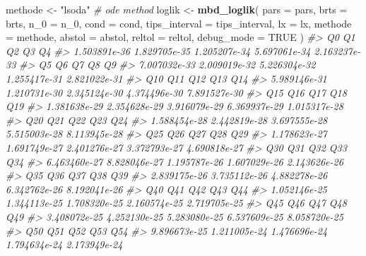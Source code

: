 \documentclass[]{article}
\newenvironment{Shaded}{\begin{snugshade}}{\end{snugshade}}
\newcommand{\CommentTok}[1]{\textcolor[rgb]{0.56,0.35,0.01}{\textit{#1}}}
\newcommand{\DataTypeTok}[1]{\textcolor[rgb]{0.13,0.29,0.53}{#1}}
\newcommand{\DecValTok}[1]{\textcolor[rgb]{0.00,0.00,0.81}{#1}}
\newcommand{\KeywordTok}[1]{\textcolor[rgb]{0.13,0.29,0.53}{\textbf{#1}}}
\newcommand{\NormalTok}[1]{#1}
\newcommand{\OtherTok}[1]{\textcolor[rgb]{0.56,0.35,0.01}{#1}}
\newcommand{\StringTok}[1]{\textcolor[rgb]{0.31,0.60,0.02}{#1}}
\begin{document}
\begin{Shaded}
\begin{Highlighting}[]
\NormalTok{methode <-}\StringTok{ "lsoda"} \CommentTok{# ode method}
\NormalTok{loglik <-}\StringTok{ }\KeywordTok{mbd_loglik}\NormalTok{(}
  \DataTypeTok{pars =}\NormalTok{ pars,}
  \DataTypeTok{brts =}\NormalTok{ brts,}
  \DataTypeTok{n_0 =}\NormalTok{ n_}\DecValTok{0}\NormalTok{,}
  \DataTypeTok{cond =}\NormalTok{ cond,}
  \DataTypeTok{tips_interval =}\NormalTok{ tips_interval,}
  \DataTypeTok{lx =}\NormalTok{ lx,}
  \DataTypeTok{methode =}\NormalTok{ methode,}
  \DataTypeTok{abstol =}\NormalTok{ abstol,}
  \DataTypeTok{reltol =}\NormalTok{ reltol,}
  \DataTypeTok{debug_mode =} \OtherTok{TRUE}
\NormalTok{)}
\CommentTok{#>            Q0            Q1            Q2            Q3            Q4 }
\CommentTok{#>  1.503891e-36  1.829705e-35  1.205207e-34  5.697061e-34  2.163237e-33 }
\CommentTok{#>            Q5            Q6            Q7            Q8            Q9 }
\CommentTok{#>  7.007032e-33  2.009019e-32  5.226304e-32  1.255417e-31  2.821022e-31 }
\CommentTok{#>           Q10           Q11           Q12           Q13           Q14 }
\CommentTok{#>  5.989146e-31  1.210731e-30  2.345124e-30  4.374496e-30  7.891527e-30 }
\CommentTok{#>           Q15           Q16           Q17           Q18           Q19 }
\CommentTok{#>  1.381638e-29  2.354628e-29  3.916079e-29  6.369937e-29  1.015317e-28 }
\CommentTok{#>           Q20           Q21           Q22           Q23           Q24 }
\CommentTok{#>  1.588454e-28  2.442819e-28  3.697555e-28  5.515003e-28  8.113945e-28 }
\CommentTok{#>           Q25           Q26           Q27           Q28           Q29 }
\CommentTok{#>  1.178623e-27  1.691749e-27  2.401276e-27  3.372793e-27  4.690818e-27 }
\CommentTok{#>           Q30           Q31           Q32           Q33           Q34 }
\CommentTok{#>  6.463460e-27  8.828046e-27  1.195787e-26  1.607029e-26  2.143626e-26 }
\CommentTok{#>           Q35           Q36           Q37           Q38           Q39 }
\CommentTok{#>  2.839175e-26  3.735112e-26  4.882278e-26  6.342762e-26  8.192041e-26 }
\CommentTok{#>           Q40           Q41           Q42           Q43           Q44 }
\CommentTok{#>  1.052146e-25  1.344113e-25  1.708320e-25  2.160574e-25  2.719705e-25 }
\CommentTok{#>           Q45           Q46           Q47           Q48           Q49 }
\CommentTok{#>  3.408072e-25  4.252130e-25  5.283080e-25  6.537609e-25  8.058720e-25 }
\CommentTok{#>           Q50           Q51           Q52           Q53           Q54 }
\CommentTok{#>  9.896673e-25  1.211005e-24  1.476696e-24  1.794634e-24  2.173949e-24 }

\end{Highlighting}
\end{Shaded}
\end{document}
